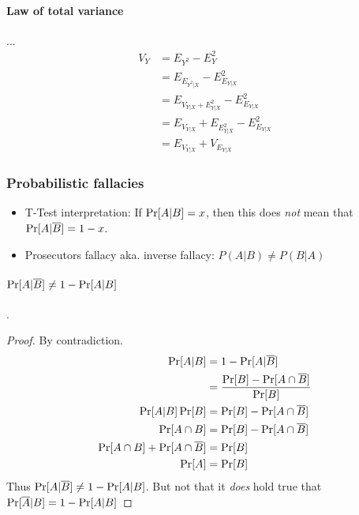 \paragraph{Law of total variance} ...
\begin{equation} \label{lawOfTotalVariance}
    \begin{aligned}
        V_Y &= E_{Y^2} - E_Y^2 \\
            &= E_{E_{Y^2 | X}} - E^2_{E_{Y|X}} \\
            &= E_{  V_{Y|X} + E^2_{Y|X}  } - E^2_{E_{Y|X}} \\
            &= E_{V_{Y|X}} + E_{E^2_{Y|X}} - E^2_{E_{Y|X}} \\
            &= E_{V_{Y|X}} + V_{E_{Y|X}}
    \end{aligned}
\end{equation}
 
 
 \subsubsection{Probabilistic fallacies}
 \begin{itemize}
     \item T-Test interpretation: If $\operatorname{Pr}[A|B] = x$, then this does \emph{not} mean that $\operatorname{Pr}[A|\overline{B}] = 1 - x$.
     \item Prosecutors fallacy aka. inverse fallacy: $P(A|B) \neq P(B|A)$
 \end{itemize}

 \paragraph{$\operatorname{Pr}[A|\overline{B}] \neq 1 - \operatorname{Pr}[A | B]$}. 
 \begin{proof}
     By contradiction. 
     \begin{equation}
         \begin{aligned}
            \operatorname{Pr}[A|B]                 &= 1 - \operatorname{Pr}[A | \overline{B}] \\
                                            &= \frac{  \operatorname{Pr}[B] - \operatorname{Pr}[A \cap \overline{B}]  }{  \operatorname{Pr}[B]  }  \\
            \operatorname{Pr}[A|B] \operatorname{Pr}[B]   &=         \operatorname{Pr}[B] - \operatorname{Pr}[A \cap \overline{B}] \\
            \operatorname{Pr}[A \cap B]   &= \operatorname{Pr}[B] - \operatorname{Pr}[A \cap \overline{B}] \\
            \operatorname{Pr}[A \cap B] + \operatorname{Pr}[A \cap \overline{B}]  &= \operatorname{Pr}[B] \\
            \operatorname{Pr}[A] &= \operatorname{Pr}[B]
         \end{aligned}
     \end{equation}
     Thus $\operatorname{Pr}[A|\overline{B}] \neq 1 - \operatorname{Pr}[A | B]$. But not that it \emph{does} hold true that $\operatorname{Pr}[\overline{A}|B] = 1 - \operatorname{Pr}[A | B]$
 \end{proof}
 



